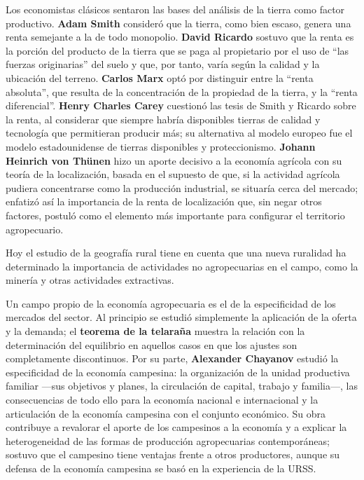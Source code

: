 \documentclass[
  man,
  floatsintext,
  longtable,
  a4paper,
  nolmodern,
  notxfonts,
  notimes,
  12pt,
  colorlinks=true,linkcolor=blue,citecolor=blue,urlcolor=blue]{apa7}
\begin{document}
Los economistas clásicos sentaron las bases del análisis de la tierra
como factor productivo. \textbf{Adam Smith} consideró que la tierra,
como bien escaso, genera una renta semejante a la de todo monopolio.
\textbf{David Ricardo} sostuvo que la renta es la porción del producto
de la tierra que se paga al propietario por el uso de ``las fuerzas
originarias'' del suelo y que, por tanto, varía según la calidad y la
ubicación del terreno. \textbf{Carlos Marx} optó por distinguir entre la
``renta absoluta'', que resulta de la concentración de la propiedad de
la tierra, y la ``renta diferencial''. \textbf{Henry Charles Carey}
cuestionó las tesis de Smith y Ricardo sobre la renta, al considerar que
siempre habría disponibles tierras de calidad y tecnología que
permitieran producir más; su alternativa al modelo europeo fue el modelo
estadounidense de tierras disponibles y proteccionismo. \textbf{Johann
Heinrich von Thünen} hizo un aporte decisivo a la economía agrícola con
su teoría de la localización, basada en el supuesto de que, si la
actividad agrícola pudiera concentrarse como la producción industrial,
se situaría cerca del mercado; enfatizó así la importancia de la renta
de localización que, sin negar otros factores, postuló como el elemento
más importante para configurar el territorio agropecuario.

Hoy el estudio de la geografía rural tiene en cuenta que una nueva
ruralidad ha determinado la importancia de actividades no agropecuarias
en el campo, como la minería y otras actividades extractivas.

Un campo propio de la economía agropecuaria es el de la especificidad de
los mercados del sector. Al principio se estudió simplemente la
aplicación de la oferta y la demanda; el \textbf{teorema de la telaraña}
muestra la relación con la determinación del equilibrio en aquellos
casos en que los ajustes son completamente discontinuos. Por su parte,
\textbf{Alexander Chayanov} estudió la especificidad de la economía
campesina: la organización de la unidad productiva familiar ---sus
objetivos y planes, la circulación de capital, trabajo y familia---, las
consecuencias de todo ello para la economía nacional e internacional y
la articulación de la economía campesina con el conjunto económico. Su
obra contribuye a revalorar el aporte de los campesinos a la economía y
a explicar la heterogeneidad de las formas de producción agropecuarias
contemporáneas; sostuvo que el campesino tiene ventajas frente a otros
productores, aunque su defensa de la economía campesina se basó en la
experiencia de la URSS.
\end{document}
